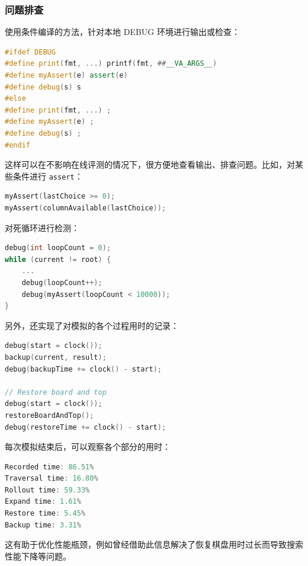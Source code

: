 \documentclass[a4paper]{article}
\begin{document}
\subsubsection{问题排查}

使用条件编译的方法，针对本地 DEBUG 环境进行输出或检查：

\begin{lstlisting}[language=C++]
#ifdef DEBUG
#define print(fmt, ...) printf(fmt, ##__VA_ARGS__)
#define myAssert(e) assert(e)
#define debug(s) s
#else
#define print(fmt, ...) ;
#define myAssert(e) ;
#define debug(s) ;
#endif
\end{lstlisting}

这样可以在不影响在线评测的情况下，很方便地查看输出、排查问题。比如，对某些条件进行 \texttt{assert}：

\begin{lstlisting}[language=C++]
myAssert(lastChoice >= 0);
myAssert(columnAvailable(lastChoice));
\end{lstlisting}

对死循环进行检测：


\begin{lstlisting}[language=C++]
debug(int loopCount = 0);
while (current != root) {
    ...
    debug(loopCount++);
    debug(myAssert(loopCount < 10000));
}
\end{lstlisting}

另外，还实现了对模拟的各个过程用时的记录：

\begin{lstlisting}[language=C++]
debug(start = clock());
backup(current, result);
debug(backupTime += clock() - start);

// Restore board and top
debug(start = clock());
restoreBoardAndTop();
debug(restoreTime += clock() - start);
\end{lstlisting}

每次模拟结束后，可以观察各个部分的用时：

\begin{lstlisting}[language=C++]
Recorded time: 86.51%
Traversal time: 16.80%
Rollout time: 59.33%
Expand time: 1.61%
Restore time: 5.45%
Backup time: 3.31%
\end{lstlisting}

这有助于优化性能瓶颈，例如曾经借助此信息解决了恢复棋盘用时过长而导致搜索性能下降等问题。
\end{document}

